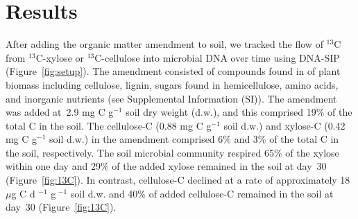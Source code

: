 \section{Results}
After adding the organic matter amendment to soil, we tracked the flow of
$^{13}$C from $^{13}$C-xylose or $^{13}$C-cellulose into microbial DNA over
time using DNA-SIP (Figure~\ref{fig:setup}). The amendment consisted of
compounds found in of plant biomass including cellulose, lignin, sugars
found in hemicellulose, amino acids, and inorganic nutrients (see Supplemental
Information (SI)). The amendment was added at~2.9 mg C g$^{-1}$ soil dry weight
(d.w.), and this comprised 19\% of the total C in the soil. The cellulose-C
(0.88 mg C g$^{-1}$ soil d.w.) and xylose-C (0.42 mg C g$^{-1}$ soil d.w.) in
the amendment comprised 6\% and 3\% of the total C in the soil, respectively.
The soil microbial community respired 65\% of the xylose within one day and
29\% of the added xylose remained in the soil at day~30 (Figure~\ref{fig:13C}).
In contrast, cellulose-C declined at a rate of approximately 18 $\mu$g
C d $^{-1}$ g $^{-1}$ soil d.w. and 40\% of added cellulose-C remained in the
soil at day~30 (Figure~\ref{fig:13C}).

